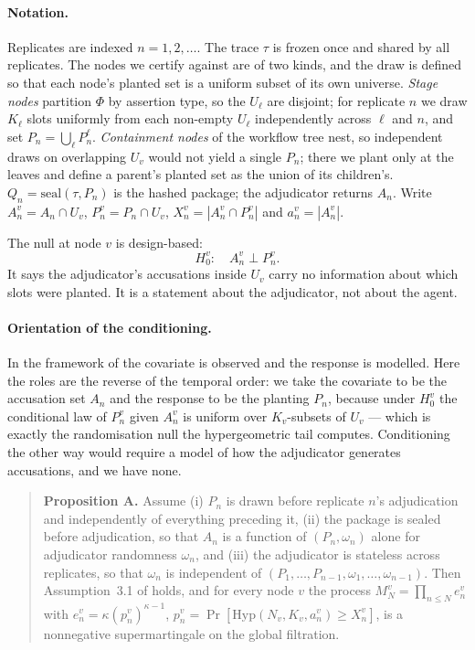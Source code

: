 \documentclass[10pt]{article}
\begin{document}
\paragraph{Notation.} Replicates are indexed $n=1,2,\dots$. The trace $\tau$ is
frozen once and shared by all replicates. The nodes we certify against are of
two kinds, and the draw is defined so that each node's planted set is a uniform
subset of its own universe. \emph{Stage nodes} partition $\Phi$ by assertion
type, so the $U_\ell$ are disjoint; for replicate $n$ we draw $K_\ell$ slots
uniformly from each non-empty $U_\ell$ independently across $\ell$ and $n$, and
set $P_n=\bigcup_\ell P^\ell_n$. \emph{Containment nodes} of the workflow tree
nest, so independent draws on overlapping $U_v$ would not yield a single $P_n$;
there we plant only at the leaves and define a parent's planted set as the
union of its children's. $Q_n=\mathrm{seal}(\tau,P_n)$ is the hashed package;
the adjudicator returns $A_n$. Write $A^v_n=A_n\cap U_v$, $P^v_n=P_n\cap U_v$,
$X^v_n=|A^v_n\cap P^v_n|$ and $a^v_n=|A^v_n|$.

The null at node $v$ is design-based:
\[
  H^v_0:\quad A^v_n \perp P^v_n .
\]
It says the adjudicator's accusations inside $U_v$ carry no information about
which slots were planted. It is a statement about the adjudicator, not about
the agent.

\paragraph{Orientation of the conditioning.} In the framework of
\cite{stoppedebh} the covariate is observed and the response is modelled. Here
the roles are the reverse of the temporal order: we take the covariate to be
the accusation set $A_n$ and the response to be the planting $P_n$, because
under $H^v_0$ the conditional law of $P^v_n$ given $A^v_n$ is uniform over
$K_v$-subsets of $U_v$ --- which is exactly the randomisation null the
hypergeometric tail computes. Conditioning the other way would require a model
of how the adjudicator generates accusations, and we have none.

\begin{quote}
\textbf{Proposition A.} Assume (i) $P_n$ is drawn before replicate $n$'s
adjudication and independently of everything preceding it, (ii) the package is
sealed before adjudication, so that $A_n$ is a function of $(P_n,\omega_n)$
alone for adjudicator randomness $\omega_n$, and (iii) the adjudicator is
stateless across replicates, so that $\omega_n$ is independent of
$(P_1,\dots,P_{n-1},\omega_1,\dots,\omega_{n-1})$. Then Assumption~3.1 of
\cite{stoppedebh} holds, and for every node $v$ the process
$M^v_N=\prod_{n\le N}e^v_n$ with $e^v_n=\kappa (p^v_n)^{\kappa-1}$,
$p^v_n=\Pr[\mathrm{Hyp}(N_v,K_v,a^v_n)\ge X^v_n]$, is a nonnegative
supermartingale on the global filtration.
\end{quote}
\end{document}
